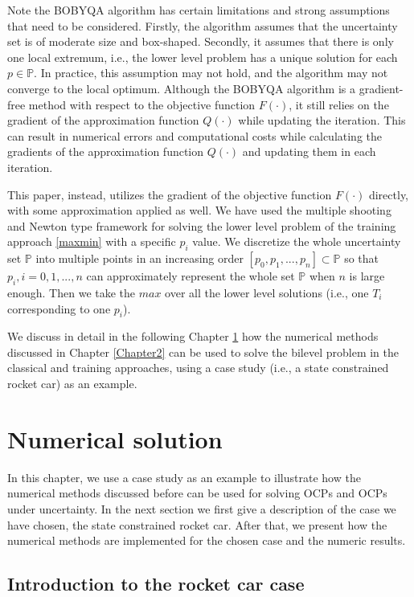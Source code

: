 \documentclass  [
  paper    = a4,
  BCOR     = 10mm,
  twoside,
  fontsize = 12pt,
  fleqn,
  toc      = bibnumbered,
  toc      = listofnumbered,
  numbers  = noendperiod,
  headings = normal,
  listof   = leveldown,
  version  = 3.03
]                                       {scrreprt}
\newcommand{\<}{\langle}
\renewcommand{\>}{\rangle}
\begin{document}
Note the BOBYQA algorithm has certain limitations and strong assumptions that need to be considered. Firstly, the algorithm assumes that the uncertainty set is of moderate size and box-shaped. Secondly, it assumes that there is only one local extremum, i.e., the lower level problem has a unique solution for each $p \in \mathbb{P}$. In practice, this assumption may not hold, and the algorithm may not converge to the local optimum. Although the BOBYQA algorithm is a gradient-free method with respect to the objective function $F(\cdot)$, it still relies on the gradient of the approximation function $Q(\cdot)$ while updating the iteration. This can result in numerical errors and computational costs while calculating the gradients of the approximation function $Q(\cdot)$ and updating them in each iteration.


This paper, instead, utilizes the gradient of the objective function $F(\cdot)$ directly, with some approximation applied as well. We have used the multiple shooting and Newton type framework for solving the lower level problem of the training approach \ref{maxmin} with a specific $p_i$ value. We discretize the whole uncertainty set $\mathbb{P}$ into multiple points in an increasing order $[p_0, p_1, ..., p_n] \subset \mathbb{P}$ so that $p_i, i =0, 1, ..., n$ can approximately represent the whole set $\mathbb{P}$ when $n$ is large enough. Then we take the $max$ over all the lower level solutions (i.e., one $T_i$ corresponding to one $p_i$).

We discuss in detail in the following Chapter \ref{Chapter4} how the numerical methods discussed in Chapter \ref{Chapter2} can be used to solve the bilevel problem in the classical and training approaches, using a case study (i.e., a state constrained rocket car) as an example.

\chapter{Numerical solution}
\label{Chapter4}
In this chapter, we use a case study as an example to illustrate how the numerical methods discussed before can be used for solving OCPs and OCPs under uncertainty. In the next section we first give a description of the case we have chosen, the state constrained rocket car. After that, we present how the numerical methods are implemented for the chosen case and the numeric results.  

\section{Introduction to the rocket car case}
\end{document}
